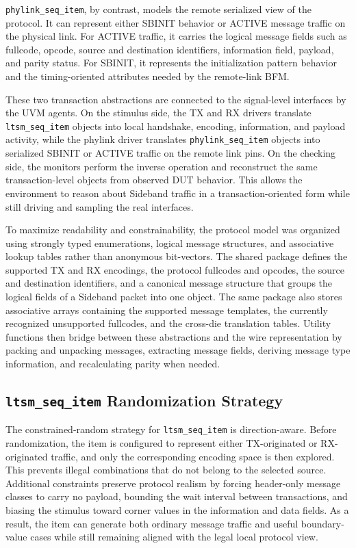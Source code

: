 \texttt{phylink\_seq\_item}, by contrast, models the remote serialized view of the protocol. It can represent either SBINIT behavior or ACTIVE message traffic on the physical link. For ACTIVE traffic, it carries the logical message fields such as fullcode, opcode, source and destination identifiers, information field, payload, and parity status. For SBINIT, it represents the initialization pattern behavior and the timing-oriented attributes needed by the remote-link BFM.

These two transaction abstractions are connected to the signal-level interfaces by the UVM agents. On the stimulus side, the TX and RX drivers translate \texttt{ltsm\_seq\_item} objects into local handshake, encoding, information, and payload activity, while the phylink driver translates \texttt{phylink\_seq\_item} objects into serialized SBINIT or ACTIVE traffic on the remote link pins. On the checking side, the monitors perform the inverse operation and reconstruct the same transaction-level objects from observed DUT behavior. This allows the environment to reason about Sideband traffic in a transaction-oriented form while still driving and sampling the real interfaces.

To maximize readability and constrainability, the protocol model was organized using strongly typed enumerations, logical message structures, and associative lookup tables rather than anonymous bit-vectors. The shared package defines the supported TX and RX encodings, the protocol fullcodes and opcodes, the source and destination identifiers, and a canonical message structure that groups the logical fields of a Sideband packet into one object. The same package also stores associative arrays containing the supported message templates, the currently recognized unsupported fullcodes, and the cross-die translation tables. Utility functions then bridge between these abstractions and the wire representation by packing and unpacking messages, extracting message fields, deriving message type information, and recalculating parity when needed.

\subsection{\texttt{ltsm\_seq\_item} Randomization Strategy}
The constrained-random strategy for \texttt{ltsm\_seq\_item} is direction-aware. Before randomization, the item is configured to represent either TX-originated or RX-originated traffic, and only the corresponding encoding space is then explored. This prevents illegal combinations that do not belong to the selected source. Additional constraints preserve protocol realism by forcing header-only message classes to carry no payload, bounding the wait interval between transactions, and biasing the stimulus toward corner values in the information and data fields. As a result, the item can generate both ordinary message traffic and useful boundary-value cases while still remaining aligned with the legal local protocol view.

